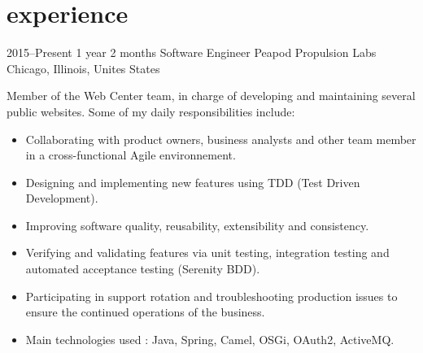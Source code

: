 \documentclass[]{friggeri-cv} %
\begin{document}



\section{experience}


\begin{entrylist}

\entry
{2015--Present}
{1 year 2 months}
{Software Engineer} 
{Peapod Propulsion Labs}
{Chicago, Illinois, Unites States}
{Member of the Web Center team, in charge of developing and maintaining several public websites. Some of my daily responsibilities include:\\
\vspace{-4mm}
\begin{itemize}
	\item Collaborating with product owners, business analysts and other team member in a cross-functional Agile environnement.
	\item Designing and implementing new features using TDD (Test Driven Development).
	\item Improving software quality, reusability, extensibility and consistency.
	\item Verifying and validating features via unit testing, integration testing and automated acceptance testing (Serenity BDD).
	\item Participating in support rotation and troubleshooting production issues to ensure the continued operations of the business.
	\item Main technologies used : Java, Spring, Camel, OSGi, OAuth2, ActiveMQ.
\end{itemize}
}
\vspace{-7mm}

\end{entrylist}
\end{document}
